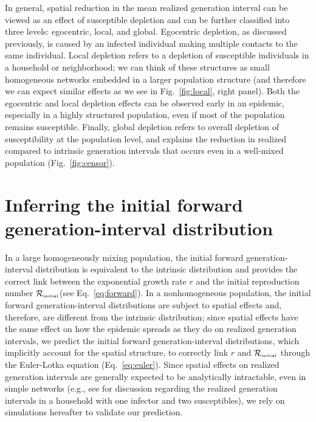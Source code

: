 \documentclass[12pt]{article}
\newcommand{\eref}[1]{Eq.~\ref{eq:#1}}
\newcommand{\fref}[1]{Fig.~\ref{fig:#1}}
\newcommand{\Rx}[1]{\ensuremath{{\mathcal R}_{#1}}\xspace}
\newcommand{\Rini}{\Rx{\textrm{\tiny initial}}}
\begin{document}
In general, spatial reduction in the mean realized generation interval can be viewed as an effect of susceptible depletion and can be further classified into three levels: egocentric, local, and global.
Egocentric depletion, as discussed previously, is caused by an infected individual making multiple contacts to the same individual.
Local depletion refers to a depletion of susceptible individuals in a household or neighborhood;
we can think of these structures as small homogeneous networks embedded in a larger population structure (and therefore we can expect similar effects as we see in \fref{local}, right panel).
Both the egocentric and local depletion effects can be observed early in an epidemic, especially in a highly structured population, even if most of the population remains susceptible.
Finally, global depletion refers to overall depletion of susceptibility at the population level, and explains the reduction in realized compared to intrinsic generation intervals that occurs even in a well-mixed population (\fref{censor}). 

\section{Inferring the initial forward generation-interval distribution}

In a large homogeneously mixing population, the initial forward generation-interval distribution is equivalent to the intrinsic distribution and provides the correct link between the exponential growth rate $r$ and the initial reproduction number \Rini (see \eref{forward}).
In a nonhomogeneous population, the initial forward generation-interval distributions are subject to spatial effects and, therefore, are different from the intrinsic distribution;
since spatial effects have the same effect on how the epidemic spreads as they do on realized generation intervals, we predict the initial forward generation-interval distributions, which implicitly account for the spatial structure, to correctly link $r$ and $\Rini$ through the Euler-Lotka equation (\eref{euler}).
Since spatial effects on realized generation intervals are generally expected to be analytically intractable, even in simple networks (e.g., see \cite{tomba2010some} for discussion regarding the realized generation intervals in a household with one infector and two susceptibles), we rely on simulations hereafter to validate our prediction.
\end{document}
